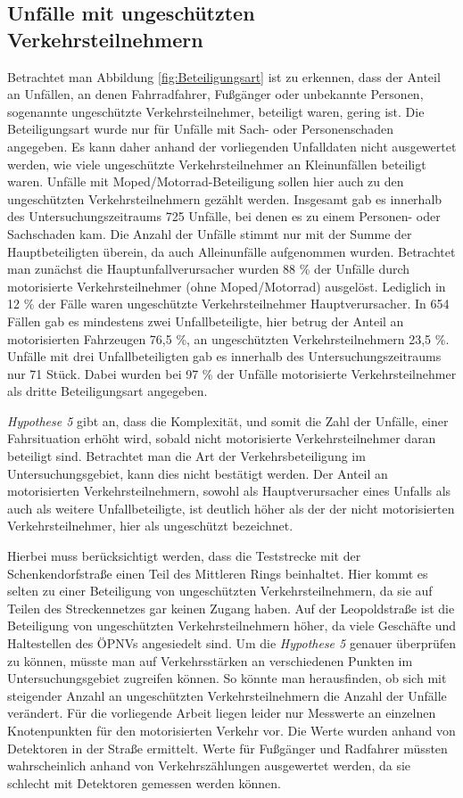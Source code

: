 \subsection{Unfälle mit ungeschützten Verkehrsteilnehmern}
Betrachtet man Abbildung \ref{fig:Beteiligungsart} ist zu erkennen, dass der Anteil an Unfällen, an denen Fahrradfahrer, Fußgänger oder unbekannte Personen, sogenannte ungeschützte Verkehrsteilnehmer, beteiligt waren, gering ist. Die Beteiligungsart wurde nur für Unfälle mit Sach- oder Personenschaden angegeben. Es kann daher anhand der vorliegenden Unfalldaten nicht ausgewertet werden, wie viele ungeschützte Verkehrsteilnehmer an Kleinunfällen beteiligt waren. Unfälle mit Moped/Motorrad-Beteiligung sollen hier auch zu den ungeschützten Verkehrsteilnehmern gezählt werden. Insgesamt gab es innerhalb des Untersuchungszeitraums 725 Unfälle, bei denen es zu einem Personen- oder Sachschaden kam. Die Anzahl der Unfälle stimmt nur mit der Summe der Hauptbeteiligten überein, da auch Alleinunfälle aufgenommen wurden. Betrachtet man zunächst die Hauptunfallverursacher wurden 88 \% der Unfälle durch motorisierte Verkehrsteilnehmer (ohne Moped/Motorrad) ausgelöst. Lediglich in 12 \% der Fälle waren ungeschützte Verkehrsteilnehmer Hauptverursacher. In 654 Fällen gab es mindestens zwei Unfallbeteiligte, hier betrug der Anteil an motorisierten Fahrzeugen 76,5 \%, an ungeschützten Verkehrsteilnehmern 23,5 \%. Unfälle mit drei Unfallbeteiligten gab es innerhalb des Untersuchungszeitraums nur 71 Stück. Dabei wurden bei 97 \% der Unfälle motorisierte Verkehrsteilnehmer als dritte Beteiligungsart angegeben.

\textit{Hypothese 5} gibt an, dass die Komplexität, und somit die Zahl der Unfälle, einer Fahrsituation erhöht wird, sobald nicht motorisierte Verkehrsteilnehmer daran beteiligt sind. Betrachtet man die Art der Verkehrsbeteiligung im Untersuchungsgebiet, kann dies nicht bestätigt werden. Der Anteil an motorisierten Verkehrsteilnehmern, sowohl als Hauptverursacher eines Unfalls als auch als weitere Unfallbeteiligte, ist deutlich höher als der der nicht motorisierten Verkehrsteilnehmer, hier als ungeschützt bezeichnet. 

Hierbei muss berücksichtigt werden, dass die Teststrecke mit der Schenkendorfstraße einen Teil des Mittleren Rings beinhaltet. Hier kommt es selten zu einer Beteiligung von ungeschützten Verkehrsteilnehmern, da sie auf Teilen des Streckennetzes gar keinen Zugang haben. Auf der Leopoldstraße ist die Beteiligung von ungeschützten Verkehrsteilnehmern höher, da viele Geschäfte und Haltestellen des ÖPNVs angesiedelt sind. Um die \textit{Hypothese 5} genauer überprüfen zu können, müsste man auf Verkehrsstärken an verschiedenen Punkten im Untersuchungsgebiet zugreifen können. So könnte man herausfinden, ob sich mit steigender Anzahl an ungeschützten Verkehrsteilnehmern die Anzahl der Unfälle verändert. Für die vorliegende Arbeit liegen leider nur Messwerte an einzelnen Knotenpunkten für den motorisierten Verkehr vor. Die Werte wurden anhand von Detektoren in der Straße ermittelt. Werte für Fußgänger und Radfahrer müssten wahrscheinlich anhand von Verkehrszählungen ausgewertet werden, da sie schlecht mit Detektoren gemessen werden können. %

